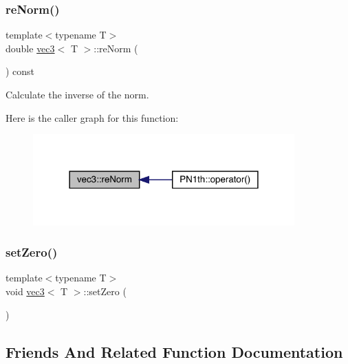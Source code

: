 \subsubsection{\texorpdfstring{re\+Norm()}{reNorm()}}
{\footnotesize\ttfamily template$<$typename T$>$ \\
double \mbox{\hyperlink{structvec3}{vec3}}$<$ T $>$\+::re\+Norm (\begin{DoxyParamCaption}{ }\end{DoxyParamCaption}) const\hspace{0.3cm}{\ttfamily [inline]}}



Calculate the inverse of the norm. 

Here is the caller graph for this function\+:\nopagebreak
\begin{figure}[H]
\begin{center}
\leavevmode
\includegraphics[width=285pt]{structvec3_afd43645a0cc5c449ae4b98f6d93774d2_icgraph}
\end{center}
\end{figure}
\mbox{\label{structvec3_a4bfe30989d83b8f3b5b3d2177f804360}} 
\subsubsection{\texorpdfstring{set\+Zero()}{setZero()}}
{\footnotesize\ttfamily template$<$typename T$>$ \\
void \mbox{\hyperlink{structvec3}{vec3}}$<$ T $>$\+::set\+Zero (\begin{DoxyParamCaption}{ }\end{DoxyParamCaption})\hspace{0.3cm}{\ttfamily [inline]}}



\subsection{Friends And Related Function Documentation}
\mbox{\label{structvec3_a8e5a34109d722a0e43d027e496eebc98}} 
